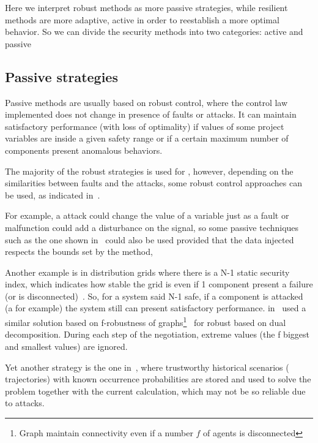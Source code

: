 \documentclass[../main.tex]{subfiles}
\begin{document}
Here we interpret robust methods as more passive strategies, while resilient methods are more adaptive, active in order to reestablish a more optimal behavior.
So we can divide the security methods into two categories: active and passive

\subsection{Passive strategies}\label{sec:protecting_against_attacks}
Passive methods are usually based on robust control, where the control law implemented does not change in presence of faults or attacks.
It can maintain satisfactory performance (with loss of optimality) if values of some project variables are inside a given safety range or if a certain maximum number of components present anomalous behaviors.

The majority of the robust strategies is used for \ftc{}, however, depending on the similarities between faults and the attacks, some robust control approaches can be used, as indicated in~\cite{TeixeiraEtAl2015,DingEtAl2018,ArauzEtAl2021}.

For example, a \fdi{} attack could change the value of a variable just as a fault or malfunction could add a disturbance on the signal, so some passive \ftc{} techniques such as the one shown in~\cite{VahidNaghaviEtAl2014} could also be used provided that the data injected respects the bounds set by the method,

Another example is in distribution grids where there is a N-1 static security index, which indicates how stable the grid is even if 1 component present a failure (or is disconnected)~\cite{QianEtAl2022}.
So, for a system said N-1 safe, if a component is attacked (a \DoS{} for example) the system still can present satisfactory performance.
\citeauthor{VelardeEtAl2018} in~\cite{VelardeEtAl2018} used a similar solution based on f-robustness of graphs\footnote{Graph maintain connectivity even if a number $f$ of agents is disconnected}~\cite{DibajiIshii2015,WangIshii2019} for robust \dmpc{} based on dual decomposition. During each step of the negotiation, extreme values (the f biggest and smallest values) are ignored.

Yet another strategy is the one in~\cite{VelardeEtAl2017a,MaestreEtAl2021}, where trustworthy historical scenarios (\mpc{} trajectories) with known occurrence probabilities are stored and used to solve the problem together with the current calculation, which may not be so reliable due to attacks.
\end{document}
